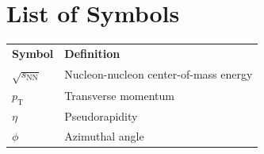 \section*{List of Symbols}

\begin{table}[H]
    \centering
    \begin{tabular}{ll}
        \textbf{Symbol} & \textbf{Definition} \\
        $\sqrt{s_{\mathrm{NN}}}$ & Nucleon-nucleon center-of-mass energy \\
        $p_{\mathrm{T}}$ & Transverse momentum \\
        $\eta$ & Pseudorapidity \\
        $\phi$ & Azimuthal angle \\
    \end{tabular}
\end{table}
